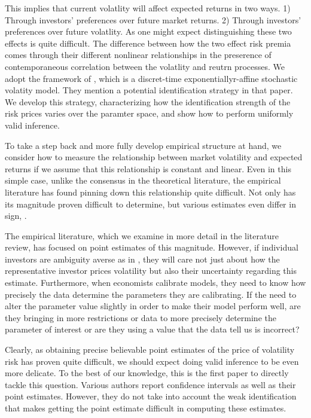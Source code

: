 \documentclass[11pt, letterpaper, twoside, final]{article}
\begin{document}
This implies that current volatlity will affect expected returns in two ways. 1) Through investors' preferences
over future market returns. 2) Through investors' preferences over future volatlity. 
As one might expect distinguishing these two effects is quite difficult. 
The difference between how the two effect risk premia comes through their different nonlinear relationships in the
preserence of contemporaneous correlation between the volatlity and reutrn processes. 
We adopt the framework of \textcite{khrapov2016affine}, which is a discret-time exponentiallyr-affine stochastic
volatity model.
They mention a potential identification strategy in that paper. 
We develop this strategy,  characterizing how the identification strength of the risk prices varies over the
paramter space, and show how to perform uniformly valid inference.

To take a step back and more fully develop empirical structure at hand, we consider how to measure the
relationship between market volatility and expected returns if we assume that this relationship is constant and
linear. 
Even in this simple case, unlike the consensus in the theoretical literature, the empirical literature has found
pinning down this relationship quite difficult.
Not only has its magnitude proven difficult to determine, but various estimates even differ in sign,
\parencite{lettau2010measuring}.

The empirical literature, which we examine in more detail in the literature review, has focused on point estimates
of this magnitude. 
However, if individual investors are ambiguity averse as in \textcite{hansen2001robust, jiu2012ambiguity}, they
will care not just about how the representative investor prices volatility but also their uncertainty regarding
this estimate. 
Furthermore, when economists calibrate models, they need to know how precisely the data determine the parameters
they are calibrating.
If the need to alter the parameter value slightly in order to make their model perform well, are they bringing in
more restrictions or data to more precisely determine the parameter of interest or are they using a value that the
data tell us is incorrect?

Clearly, as obtaining precise believable point estimates of the price of volatility risk has proven quite
difficult, we should expect doing valid inference to be even more delicate.
To the best of our knowledge, this is the first paper to directly tackle this question.
Various authors report confidence intervals as well as their point estimates.
However, they do not take into account the weak identification that makes getting the point estimate difficult in
computing these estimates.
\end{document}
